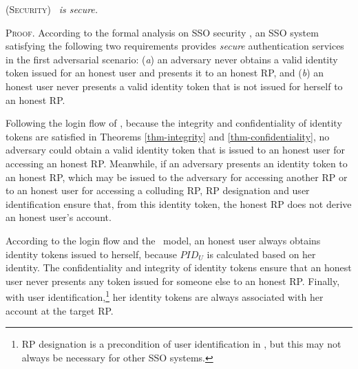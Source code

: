 \begin{thm}
\textsc{(Security)} \emph{\usso\ is secure.}
\end{thm}

\noindent\textsc{Proof.}
According to the formal analysis on SSO security \cite{SPRESSO, FettKS14},
    an SSO system satisfying the following two requirements provides \emph{secure} authentication services in the first adversarial scenario: (\emph{a}) an adversary never obtains a valid identity token issued for an honest user and presents it to an honest RP, and (\emph{b}) an honest user never presents a valid identity token that is not issued for herself to an honest RP.

Following the login flow of \usso, because the integrity and confidentiality of identity tokens are satisfied in Theorems \ref{thm-integrity} and \ref{thm-confidentiality},
 no adversary could obtain a valid identity token that is issued to an honest user for accessing an honest RP. %
Meanwhile, if an adversary presents an identity token to an honest RP, which may be issued to the adversary for accessing another RP or to an honest user for accessing a colluding RP, RP designation and user identification ensure that, from this identity token, the honest RP does not derive an honest user's account.

According to the login flow and the \dyu\ model, an honest user always obtains identity tokens issued to herself, because $PID_U$ is calculated based on her identity.
The confidentiality and integrity of identity tokens ensure that an honest user never presents any token issued for someone else to an honest RP. Finally, with user identification,\footnote{\newc RP designation is a precondition of user identification in \usso, but this may not always be necessary for other SSO systems.} her identity tokens are always associated with her account at the target RP.

